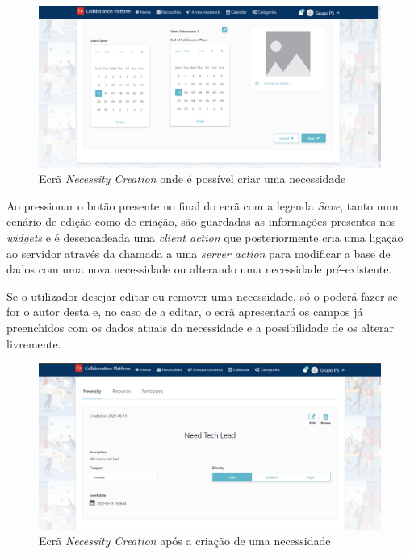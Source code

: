 \begin{figure}[H]
  \centering 
  \includegraphics[scale=0.4]{figures/NecessityCreation2.png}
  \caption{Ecrã \textit{Necessity Creation} onde é possível criar uma necessidade}\label{fig:necessityCreation2}
\end{figure}


Ao pressionar o botão presente no final do ecrã com a legenda \textit{Save}, tanto num cenário de edição como de criação, 
são guardadas as informações presentes nos \textit{widgets} e é desencadeada uma \textit{client action} que posteriormente cria uma ligação ao servidor através da chamada a uma \textit{server action} para modificar a base de dados com uma nova necessidade ou alterando uma necessidade pré-existente.

Se o utilizador desejar editar ou remover uma necessidade, só o poderá fazer se for o autor desta e, no caso de a editar, o ecrã apresentará os campos já preenchidos com os dados atuais da necessidade e a possibilidade de os alterar livremente.

\begin{figure}[H]
  \centering 
  \includegraphics[scale=0.4]{figures/NecessityCreationWithResourcesAndParticipants.png}
  \caption{Ecrã \textit{Necessity Creation} após a criação de uma necessidade}\label{fig:NecessityCreationWithResourcesAndParticipants}
\end{figure}


